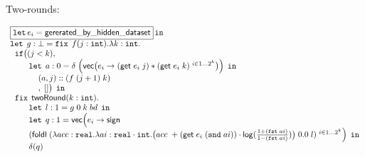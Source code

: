 \begin{figure}
\small
Two-rounds:



\[
\begin{array}{l}
\boxed{  \mathop{\mathtt{let}} e_i = \mathsf{gererated\_ by\_hidden\_dataset} } \mathop{ \mathtt{in}} \\
  \mathop{\mathtt{let}} \;  g: \bot = 
  \mathop{\mathtt{fix}} \; f(j: \mathtt{int}). \lambda k: \mathtt{int}.\\
  \hspace{.2cm}  \mathtt{if} \big (  (j < k)  ,  \\
  \hspace{.8cm}  \mathop{\mathtt{let}} \;  a: 0 = 
                 \delta \;  
             \Big(\mathsf{vec}\big(e_i \to (\mathsf{get}\; e_i \; j) * (\mathsf{get} \; e_i \;  k)^{\, \, i \in 1\dots 2^k} \big) \Big) 
                  \; \mathop{ \mathtt{in}} \\
  \hspace{1.2cm} (a, j) :: (f  \; (j+1) \;  k) \\
  \hspace{1.2cm} ,\;  [] \big) \; \mathop{ \mathtt{in}}\\
  \hspace{.2cm}  \mathop{\mathtt{fix}} \; \mathsf{twoRound}(k : \mathtt{int}). 
                 \\
  \hspace{.8cm}  \mathop{\mathtt{let}} \;  l: 1 = g \;  0 \;  k \; bd \;  \mathop{ \mathtt{in}} \\
  \hspace{.8cm}  \mathop{\mathtt{let}} \;  q: 1 = \mathsf{vec}\Big(e_i \to
                    \mathsf{sign} \; \\ 
  \hspace{.8cm}  (\mathsf{foldl} \;  (\lambda acc: \mathtt{real}. 
                 \lambda ai: \mathtt{real} \cdot \mathtt{int}. 
                 \big(acc\; + (\mathsf{get} \; e_i \;  (\mathtt{snd} \; ai)) 
                 \cdot \mathsf{log}(\frac{1+ (\mathtt{fst} \; ai) }{1- (\mathtt{fst} \; ai)}) \big)
                 \;  0.0 \;  l )^{\, \, i \in 1\dots 2^k} \Big) \;  \mathop{ \mathtt{in}} \\
  \hspace{.8cm}  \delta ( q )
\end{array}
\]
\end{figure}



